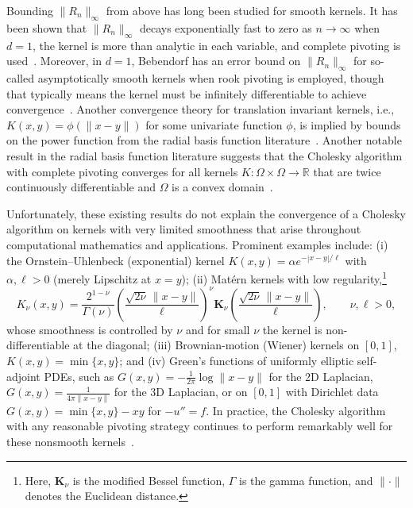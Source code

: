 \documentclass{amsart}
\theoremstyle{definition}
\theoremstyle{remark}
\begin{document}
Bounding $\|R_n\|_\infty$ from above has long been studied for smooth kernels. It has been shown that $\|R_n\|_\infty$ decays exponentially fast to zero as $n\rightarrow\infty$ when $d = 1$, the kernel is more than analytic in each variable, and complete pivoting is used~\cite{cortinovis2020maximum,townsend2015continuous}. Moreover, in $d=1$, Bebendorf has an error bound on $\|R_n\|_\infty$ for so-called asymptotically smooth kernels when rook pivoting is employed, though that typically means the kernel must be infinitely differentiable to achieve convergence~\cite{bebendorf2000approximation}. Another convergence theory for translation invariant kernels, i.e., $K(x,y) = \phi(\|x-y\|)$ for some univariate function $\phi$, is implied by bounds on the power function from the radial basis function literature~\cite{santin6convergence}. Another notable result in the radial basis function literature suggests that the Cholesky algorithm with complete pivoting converges for all kernels $K:\Omega\times \Omega\rightarrow \mathbb{R}$ that are twice continuously differentiable and $\Omega$ is a convex domain~\cite[Thm.~4.3]{de2005near}. 

Unfortunately, these existing results do not explain the convergence of a Cholesky algorithm on kernels with very limited smoothness that arise throughout computational mathematics and applications. Prominent examples include:
(i) the Ornstein--Uhlenbeck (exponential) kernel $K(x,y)=\alpha e^{-|x-y|/\ell}$ with $\alpha,\ell>0$ (merely Lipschitz at $x=y$);
(ii) Matérn kernels with low regularity,\footnote{Here, $\mathbf{K}_\nu$ is the modified Bessel function, $\Gamma$ is the gamma function, and $\|\cdot\|$ denotes the Euclidean distance.}
\[
K_\nu(x,y)=\frac{2^{1-\nu}}{\Gamma(\nu)}\!\left(\frac{\sqrt{2\nu}\,\|x-y\|}{\ell}\right)^\nu
\mathbf{K}_\nu\!\left(\frac{\sqrt{2\nu}\,\|x-y\|}{\ell}\right),\qquad \nu,\ell >0,
\]
whose smoothness is controlled by $\nu$ and for small $\nu$ the kernel is non-differentiable at the diagonal;
(iii) Brownian-motion (Wiener) kernels on $[0,1]$, $K(x,y)=\min\{x,y\}$;
and (iv) Green’s functions of uniformly elliptic self-adjoint PDEs, such as
$G(x,y) = -\frac{1}{2\pi}\log\|x-y\|$ for the 2D Laplacian, $G(x,y)=\frac{1}{4\pi\|x-y\|}$ for the 3D Laplacian, or on $[0,1]$ with Dirichlet data $G(x,y)=\min\{x,y\}-xy$ for $-u''=f$. 
In practice, the Cholesky algorithm with any reasonable pivoting strategy continues to perform remarkably well for these nonsmooth kernels~.
\end{document}
